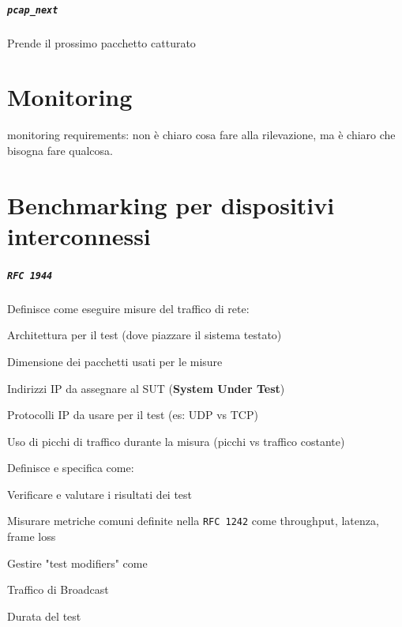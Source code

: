 \documentclass[10pt]{book}
\begin{document}
\paragraph{\texttt{pcap\_next}} Prende il prossimo pacchetto catturato
\chapter{Monitoring}
monitoring requirements: non è chiaro cosa fare alla rilevazione, ma è chiaro che bisogna fare qualcosa.
\chapter{Benchmarking per dispositivi interconnessi}
\paragraph{\texttt{RFC 1944}} Definisce come eseguire misure del traffico di rete:
\begin{list}{-}{}
	\item Architettura per il test (dove piazzare il sistema testato)
	\item Dimensione dei pacchetti usati per le misure
	\item Indirizzi IP da assegnare al SUT (\textbf{System Under Test})
	\item Protocolli IP da usare per il test (es: UDP vs TCP)
	\item Uso di picchi di traffico durante la misura (picchi vs traffico costante)
\end{list}
Definisce e specifica come:
\begin{list}{-}{}
	\item Verificare e valutare i risultati dei test
	\item Misurare metriche comuni definite nella \texttt{RFC 1242} come throughput, latenza, frame loss
	\item Gestire "test modifiers" come
	\begin{list}{-}{}
		\item Traffico di Broadcast
		\item Durata del test
	\end{list}
\end{list}
\end{document}
